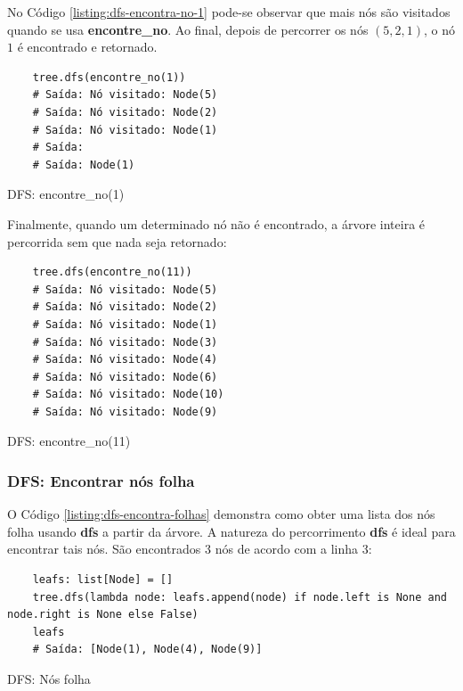 No Código \ref{listing:dfs-encontra-no-1} pode-se observar que mais nós são visitados quando se usa \textbf{encontre\_no}. Ao final, depois de percorrer
os nós $(5,2,1)$, o nó $1$ é encontrado e retornado.

\begin{listing}[H]
    \begin{verbatim}
    tree.dfs(encontre_no(1))
    # Saída: Nó visitado: Node(5)
    # Saída: Nó visitado: Node(2)
    # Saída: Nó visitado: Node(1)
    # Saída: 
    # Saída: Node(1)
    \end{verbatim}
    \caption{DFS: encontre\_no(1)}
    \label{listing:dfs-encontra-no-1}
\end{listing}

Finalmente, quando um determinado nó não é encontrado, a árvore inteira é percorrida sem que nada seja retornado:

\begin{listing}[H]
    \begin{verbatim}
    tree.dfs(encontre_no(11))
    # Saída: Nó visitado: Node(5)
    # Saída: Nó visitado: Node(2)
    # Saída: Nó visitado: Node(1)
    # Saída: Nó visitado: Node(3)
    # Saída: Nó visitado: Node(4)
    # Saída: Nó visitado: Node(6)
    # Saída: Nó visitado: Node(10)
    # Saída: Nó visitado: Node(9)
    \end{verbatim}
    \caption{DFS: encontre\_no(11)}
    \label{listing:dfs-encontra-no-11}
\end{listing}

\subsubsection{DFS: Encontrar nós folha}

O Código \ref{listing:dfs-encontra-folhas} demonstra como obter uma lista dos nós folha usando \textbf{dfs} a partir da árvore.
A natureza do percorrimento \textbf{dfs} é ideal para encontrar tais nós. São encontrados 3 nós de acordo com a linha 3:

\begin{listing}[H]
    \begin{verbatim}
    leafs: list[Node] = []
    tree.dfs(lambda node: leafs.append(node) if node.left is None and node.right is None else False)
    leafs
    # Saída: [Node(1), Node(4), Node(9)]
    \end{verbatim}
    \caption{DFS: Nós folha}
    \label{listing:dfs-encontra-folhas}
\end{listing}

